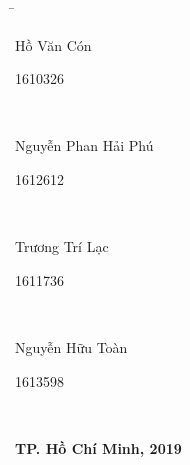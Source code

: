 \begin{titlepage}
    \begin{tabbing}
    \hspace{8cm}\=\hspace{2cm} \kill
    \\
    \hspace{0.6cm}\begin{bfseries}Hồ Văn Cón\end{bfseries}\> \begin{bfseries}1610326\end{bfseries}\\
    \hspace{0.6cm}\begin{bfseries}Nguyễn Phan Hải Phú\end{bfseries}\> \begin{bfseries}1612612\end{bfseries}\\
    \hspace{0.6cm}\begin{bfseries}Trương Trí Lạc\end{bfseries}\> \begin{bfseries}1611736\end{bfseries}\\
    \hspace{0.6cm}\begin{bfseries}Nguyễn Hữu Toàn\end{bfseries}\> \begin{bfseries}1613598\end{bfseries}\\
    
    \end{tabbing}
    \vspace{10pt}
    \begin{center}
        \textbf{TP. Hồ Chí Minh, 2019}
    \end{center}
    \end{titlepage}